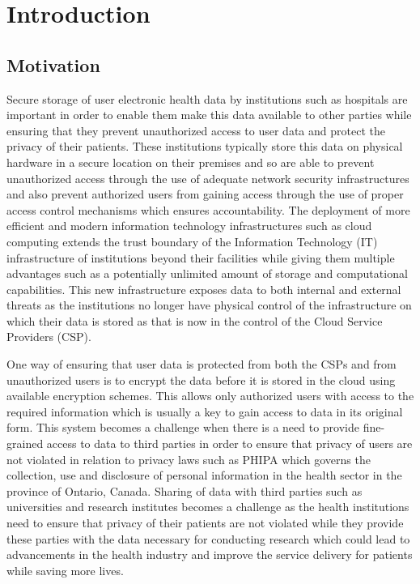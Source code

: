 \chapter{Introduction}
\label{chap:introduction}

\section{Motivation}

Secure storage of user electronic health data by institutions such as hospitals are important in order to enable them make this data available to other parties while ensuring that they prevent unauthorized access to user data and protect the privacy of their patients. These institutions typically store this data on physical hardware in a secure location on their premises and so are able to prevent unauthorized access through the use of adequate network security infrastructures and also prevent authorized users from gaining access through the use of proper access control mechanisms which ensures accountability. The deployment of more efficient and modern information technology infrastructures such as cloud computing extends the trust boundary of the Information Technology (IT) infrastructure of institutions beyond their facilities while giving them multiple advantages such as a potentially unlimited amount of storage and computational capabilities. This new infrastructure exposes data to both internal and external threats as the institutions no longer have physical control of the infrastructure on which their data is stored as that is now in the control of the Cloud Service Providers (CSP).
 
One way of ensuring that user data is protected from both the CSPs and from unauthorized users is to encrypt the data before it is stored in the cloud using available encryption schemes. This allows only authorized users with access to the required information which is usually a key to gain access to data in its original form. This system becomes a challenge when there is a need to provide fine-grained access to data to third parties in order to ensure that privacy of users are not violated in relation to privacy laws such as PHIPA \cite{pihipa} which governs the collection, use and disclosure of personal information in the health sector in the province of Ontario, Canada. Sharing of data with third parties such as universities and research institutes becomes a challenge as the health institutions need to ensure that privacy of their patients are not violated while they provide these parties with the data necessary for conducting research which could lead to advancements in the health industry and improve the service delivery for patients while saving more lives.


